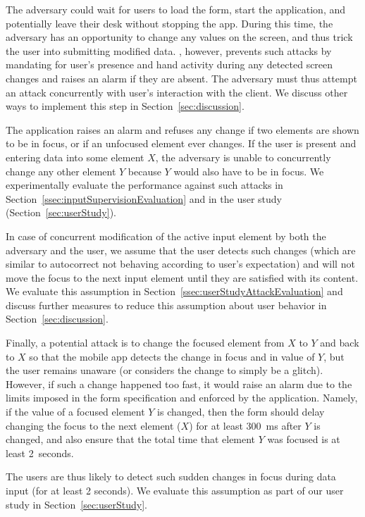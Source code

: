The adversary could wait for users to load the form, start the application, and potentially leave their desk without stopping the app.
During this time, the adversary has an opportunity to change any values on the screen, and thus trick the user into submitting modified data.
\sysname, however, prevents such attacks by mandating for user's presence and hand activity during any detected screen changes and raises an alarm if they are absent.
The adversary must thus attempt an attack concurrently with user's interaction with the client.
We discuss other ways to implement this step in Section~\ref{sec:discussion}.

The application raises an alarm and refuses any change if two elements are shown to be in focus, or if an unfocused element ever changes.
If the user is present and entering data into some element $X$, the adversary is unable to concurrently change any other element $Y$ because $Y$ would also have to be in focus.
We experimentally evaluate the performance against such attacks in Section~\ref{ssec:inputSupervisionEvaluation} and in the user study (Section~\ref{sec:userStudy}).

In case of concurrent modification of the active input element by both the adversary and the user, we assume that the user detects such changes (which are similar to autocorrect not behaving according to user's expectation) and will not move the focus to the next input element until they are satisfied with its content.
We evaluate this assumption in Section~\ref{ssec:userStudyAttackEvaluation} and discuss further measures to reduce this assumption about user behavior in Section~\ref{sec:discussion}.



Finally, a potential attack is to change the focused element from $X$ to $Y$ and back to $X$ so that the mobile app detects the change in focus and in value of $Y$, but the user remains unaware (or considers the change to simply be a glitch).
However, if such a change happened too fast, it would raise an alarm due to the limits imposed in the form specification and enforced by the application.
Namely, if the value of a focused element $Y$ is changed, then the form should delay changing the focus to the next element ($X$) for at least 300~ms after $Y$ is changed, and also ensure that the total time that element $Y$ was focused is at least 2~seconds.

The users are thus likely to detect such sudden changes in focus during data input (for at least 2 seconds). We evaluate this assumption as part of our user study in Section~\ref{sec:userStudy}.


